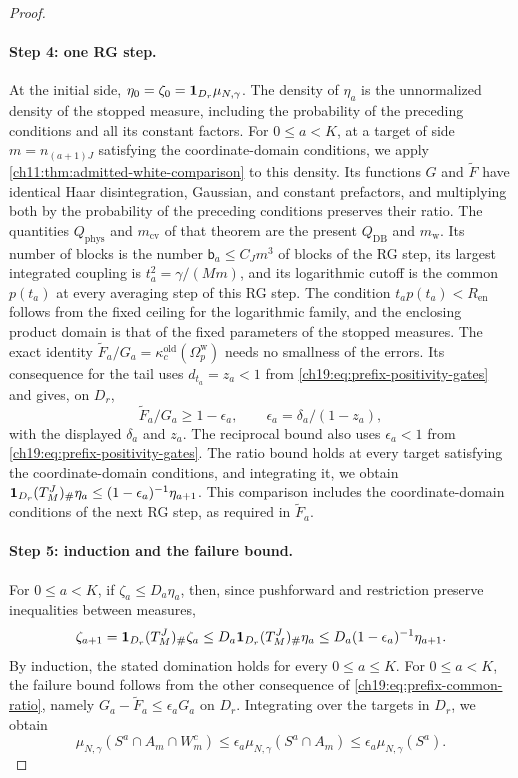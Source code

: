 \begin{proof}
\paragraph{Step 4: one RG step.}
At the initial side, $\eta_0=\zeta_0=\mathbf 1_{D_r}\mu_{N,\gamma}$. The density of $\eta_a$ is the unnormalized density of the stopped measure, including the probability of the preceding conditions and all its constant factors. For $0\le a<K$, at a target of side $m=n_{(a+1)J}$ satisfying the coordinate-domain conditions, we apply \cref{ch11:thm:admitted-white-comparison} to this density. Its functions $G$ and $\widetilde F$ have identical Haar disintegration, Gaussian, and constant prefactors, and multiplying both by the probability of the preceding conditions preserves their ratio. The quantities $Q_{\mathrm{phys}}$ and $m_{\mathrm{cv}}$ of that theorem are the present $Q_{\mathrm{DB}}$ and $m_{\mathrm w}$. Its number of blocks is the number $\mathsf b_a\le C_Jm^3$ of blocks of the RG step, its largest integrated coupling is $t_a^2=\gamma/(Mm)$, and its logarithmic cutoff is the common $p(t_a)$ at every averaging step of this RG step. The condition $t_ap(t_a)<R_{\mathrm{en}}$ follows from the fixed ceiling for the logarithmic family, and the enclosing product domain is that of the fixed parameters of the stopped measures. The exact identity $\widetilde F_a/G_a=\kappa_c^{\mathrm{old}}(\Omega_p^{\mathrm w})$ needs no smallness of the errors. Its consequence for the tail uses $d_{t_a}=z_a<1$ from \eqref{ch19:eq:prefix-positivity-gates} and gives, on $D_r$,
\begin{equation}\label{ch19:eq:prefix-common-ratio}
 \widetilde F_a/G_a\ge1-\epsilon_a,\qquad\epsilon_a=\delta_a/(1-z_a),
\end{equation}
with the displayed $\delta_a$ and $z_a$. The reciprocal bound also uses $\epsilon_a<1$ from \eqref{ch19:eq:prefix-positivity-gates}. The ratio bound holds at every target satisfying the coordinate-domain conditions, and integrating it, we obtain $\mathbf 1_{D_r}(T_M^J)_\#\eta_a\le(1-\epsilon_a)^{-1}\eta_{a+1}$. This comparison includes the coordinate-domain conditions of the next RG step, as required in $\widetilde F_a$.

\paragraph{Step 5: induction and the failure bound.}
For $0\le a<K$, if $\zeta_a\le D_a\eta_a$, then, since pushforward and restriction preserve inequalities between measures,
\[
 \zeta_{a+1}=\mathbf 1_{D_r}(T_M^J)_\#\zeta_a\le D_a\mathbf 1_{D_r}(T_M^J)_\#\eta_a\le D_a(1-\epsilon_a)^{-1}\eta_{a+1}.
\]
By induction, the stated domination holds for every $0\le a\le K$. For $0\le a<K$, the failure bound follows from the other consequence of \eqref{ch19:eq:prefix-common-ratio}, namely $G_a-\widetilde F_a\le\epsilon_aG_a$ on $D_r$. Integrating over the targets in $D_r$, we obtain
\[
 \mu_{N,\gamma}(S^a\cap A_m\cap W_m^c)\le\epsilon_a\mu_{N,\gamma}(S^a\cap A_m)\le\epsilon_a\mu_{N,\gamma}(S^a).
\]



\end{proof}
